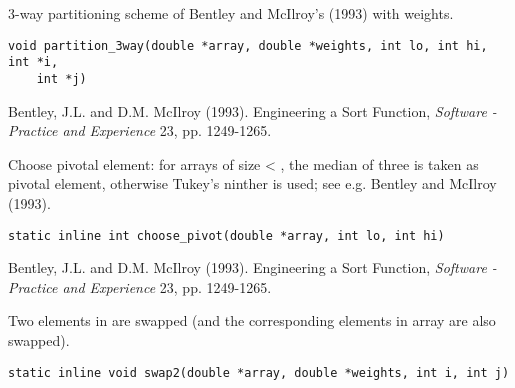 \documentclass[a4paper,oneside,10pt,DIV=12]{scrartcl}
\begin{document}
\begin{Description}
3-way partitioning scheme of Bentley and McIlroy's (1993) with weights.
\end{Description}
\begin{Usage}
\begin{verbatim}
void partition_3way(double *array, double *weights, int lo, int hi, int *i,
    int *j)
\end{verbatim}
\end{Usage}
\begin{Dependency}
\end{Dependency}
\begin{References}
Bentley, J.L. and D.M. McIlroy (1993). Engineering a Sort Function,
\textit{Software - Practice and Experience} 23, pp. 1249-1265.
\end{References}

\begin{Description}
Choose pivotal element: for arrays of size < , the
median of three is taken as pivotal element, otherwise Tukey's ninther is
used; see e.g. Bentley and McIlroy (1993).
\end{Description}
\begin{Usage}
\begin{verbatim}
static inline int choose_pivot(double *array, int lo, int hi)
\end{verbatim}
\end{Usage}
\begin{Dependency}
\end{Dependency}
\begin{References}
Bentley, J.L. and D.M. McIlroy (1993). Engineering a Sort Function,
\textit{Software - Practice and Experience} 23, pp. 1249-1265.
\end{References}

\begin{Description}
Two elements in  are swapped (and the corresponding elements in
array  are also swapped).
\end{Description}
\begin{Usage}
\begin{verbatim}
static inline void swap2(double *array, double *weights, int i, int j)
\end{verbatim}
\end{Usage}
\end{document}
